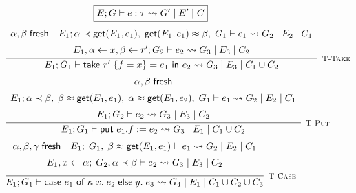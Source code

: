 \begin{figure}
    \centering
    \[
        \fbox{$E; G \vdash e : \tau \rightsquigarrow G'\; |\; E'\; |\; C$}
    \]
    \[
        \infer[\textsc{\footnotesize T-Take}]{
            E_1; G_1
                \vdash \textsf{take } r'\; \{ f = x \} = e_1 \textsf{ in } e_2
                \rightsquigarrow G_3\; |\; E_3\; |\; C_1 \cup C_2
        }{
            \begin{array}{c}
            \alpha, \beta\; \textsf{fresh}
            \hspace{1em}
            E_1; \alpha \tlt \textsf{get}(E_1,e_1),\; \textsf{get}(E_1,e_1) \teq \beta,\; G_1 \vdash e_1
                \rightsquigarrow G_2\; |\; E_2\; |\; C_1 \\[5pt]
            E_1, \alpha \leftarrow x, \beta \leftarrow r'; G_2 \vdash e_2 \rightsquigarrow G_3\; |\; E_3\; |\; C_2
            \end{array}
        }
    \]
    \vspace{0.5pt}
    \[
        \infer[\textsc{\footnotesize T-Put}]{
            E_1; G_1 \vdash \textsf{put } e_1.f := e_2
                \rightsquigarrow G_3\; |\; E_1\; |\; C_1 \cup C_2
        }{
            \begin{array}{c}
                \alpha, \beta\; \textsf{fresh} \\[5pt]
                E_1; \alpha \tlt \beta,\; \beta \teq \textsf{get}(E_1,e_1),\; \alpha \teq \textsf{get}(E_1,e_2),\; 
                    G_1 \vdash e_1 \rightsquigarrow G_2\; |\; E_2\; |\; C_1 \\[5pt]
                E_1; G_2 \vdash e_2 \rightsquigarrow G_3\; |\; E_3\; |\; C_2
            \end{array}
        }
    \]
    \vspace{0.5pt}
    \[
        \infer[\textsc{\footnotesize T-Case}]{
            E_1; G_1 \vdash \textsf{case } e_1 \textsf{ of } \kappa\; x.\; e_2\; 
                \textsf{else}\; y.\; e_3
                \rightsquigarrow G_4\; |\; E_1\; |\; C_1 \cup C_2 \cup C_3
        }{
            \begin{array}{c}
                \alpha, \beta, \gamma\; \textsf{fresh}
                \hspace{1em}
                E_1;\; G_1,\; \beta \teq \textsf{get}(E_1, e_1)  \vdash e_1 
                    \rightsquigarrow G_2\; |\; E_2\; |\; C_1 \\[5pt]
                E_1, x \leftarrow \alpha;\; G_2, \alpha \tlt \beta 
                    \vdash e_2 \rightsquigarrow G_3\; |\; E_3\; |\; C_2 \\[5pt]

\end{array}}\]
\end{figure}
